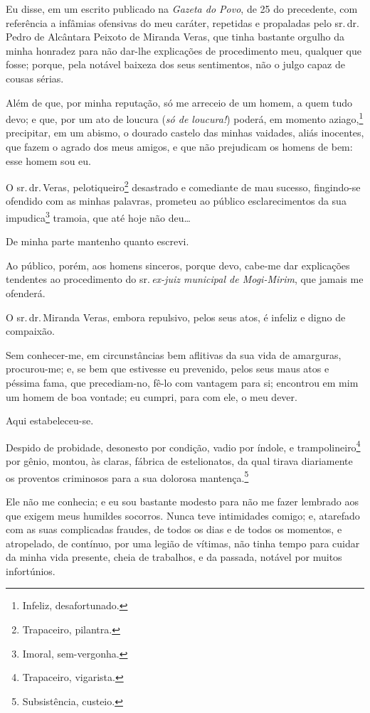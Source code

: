 Eu disse, em um escrito publicado na \emph{Gazeta do Povo}, de 25 do
precedente, com referência a infâmias ofensivas do meu caráter,
repetidas e propaladas pelo sr.\,dr.\,Pedro de Alcântara Peixoto de
Miranda Veras, que tinha bastante orgulho da minha honradez para não
dar-lhe explicações de procedimento meu, qualquer que fosse; porque,
pela notável baixeza dos seus sentimentos, não o julgo capaz de cousas
sérias.

Além de que, por minha reputação, só me arreceio de um homem, a quem
tudo devo; e que, por um ato de loucura (\emph{só de loucura!}) poderá,
em momento aziago,\footnote{Infeliz, desafortunado.} precipitar, em um
abismo, o dourado castelo das minhas vaidades, aliás inocentes, que
fazem o agrado dos meus amigos, e que não prejudicam os homens de bem:
esse homem sou eu.

O sr.\,dr.\,Veras, pelotiqueiro\footnote{Trapaceiro, pilantra.}
desastrado e comediante de mau sucesso, fingindo-se ofendido com as
minhas palavras, prometeu ao público esclarecimentos da sua
impudica\footnote{Imoral, sem-vergonha.} tramoia, que até hoje não
deu\ldots{}

De minha parte mantenho quanto escrevi.

Ao público, porém, aos homens sinceros, porque devo, cabe-me dar
explicações tendentes ao procedimento do sr.\,\emph{ex-juiz municipal de
Mogi-Mirim}, que jamais me ofenderá.

O sr.\,dr.\,Miranda Veras, embora repulsivo, pelos seus atos, é infeliz e
digno de compaixão.

Sem conhecer-me, em circunstâncias bem aflitivas da sua vida de
amarguras, procurou-me; e, se bem que estivesse eu prevenido, pelos seus
maus atos e péssima fama, que precediam-no, fê-lo com vantagem para si;
encontrou em mim um homem de boa vontade; eu cumpri, para com ele, o meu
dever.

Aqui estabeleceu-se.

Despido de probidade, desonesto por condição, vadio por índole, e
trampolineiro\footnote{Trapaceiro, vigarista.} por gênio, montou,
às claras, fábrica de estelionatos, da qual tirava diariamente os
proventos criminosos para a sua dolorosa mantença.\footnote{
  Subsistência, custeio.}

Ele não me conhecia; e eu sou bastante modesto para não me fazer
lembrado aos que exigem meus humildes socorros. Nunca teve intimidades
comigo; e, atarefado com as suas complicadas fraudes, de todos os dias e
de todos os momentos, e atropelado, de contínuo, por uma legião de
vítimas, não tinha tempo para cuidar da minha vida presente, cheia de
trabalhos, e da passada, notável por muitos infortúnios.

